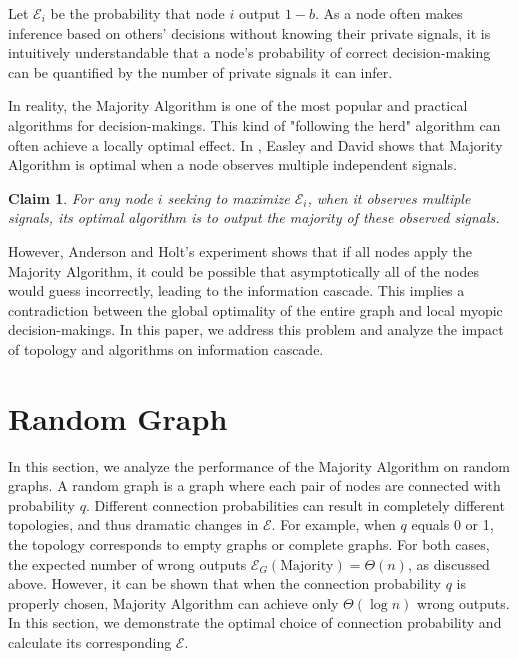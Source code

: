 \documentclass[a4paper,UKenglish]{lipics}
\newtheorem{clm}[thm]{Claim}
\theoremstyle{definition}
\begin{document}
Let $\mathcal{E}_i$ be the probability that node $i$ output $1 - b$. 
As a node often makes inference based on others' decisions without knowing their private signals, 
	it is intuitively understandable that a node's probability of correct decision-making can be quantified by the number of private signals it can infer.

In reality, the Majority Algorithm is one of the most popular and practical algorithms for decision-makings. 
This kind of "following the herd" algorithm can often achieve a locally optimal effect. 
In \cite{Easley Book}, Easley and David shows that Majority Algorithm is optimal when a node observes multiple independent signals.
\begin{clm}
	\label{clm:multiple is optimal}
	For any node $i$ seeking to maximize $\mathcal{E}_i$, 
		when it observes multiple signals, its optimal algorithm is to output the majority of these observed signals.
\end{clm}

However, Anderson and Holt's experiment shows that if all nodes apply the Majority Algorithm, it could be possible that asymptotically all of the nodes would guess incorrectly, leading to the information cascade. This implies a contradiction between the global optimality of the entire graph and local myopic decision-makings.
In this paper, we address this problem and analyze the impact of topology and algorithms on information cascade.









\section{Random Graph}
In this section, we analyze the performance of the Majority Algorithm on random graphs.
A random graph is a graph where each pair of nodes are connected with probability $q$.
Different connection probabilities can result in completely different topologies, and thus dramatic changes in $\mathcal{E}$.
For example, when $q$ equals 0 or 1, the topology corresponds to empty graphs or complete graphs.
For both cases, the expected number of wrong outputs $\mathcal{E}_G(\text{Majority}) = \Theta(n)$, as discussed above.
However, it can be shown that when the connection probability $q$ is properly chosen, Majority Algorithm can achieve only $\Theta(\log n)$ wrong outputs.
In this section, we demonstrate the optimal choice of connection probability
	and calculate its corresponding $\mathcal{E}$.
	
\end{document}
